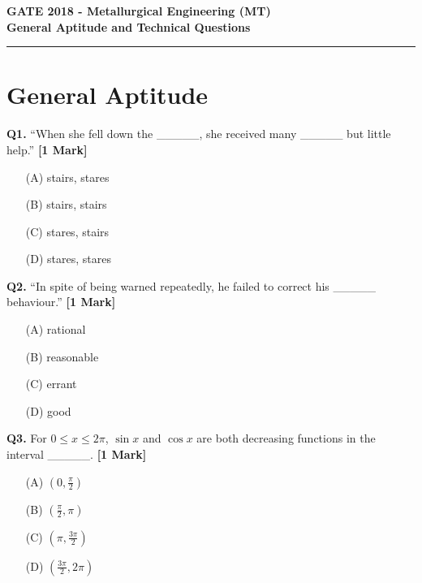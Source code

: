 \documentclass[11pt]{article}
\newcommand{\questiona}[2]{
    \noindent\textbf{Q#2.} #1 \hfill \textbf{[1 Mark]}
}
\begin{document}
\begin{center}
    \Large\textbf{GATE 2018 - Metallurgical Engineering (MT)} \\
    \large\textbf{General Aptitude and Technical Questions} \\
    \rule{\textwidth}{0.5pt} %
\end{center}

\vspace{0.5cm}


\section*{General Aptitude}

\questiona{“When she fell down the \_\_\_\_\_, she received many \_\_\_\_\_ but little help.”}{1}
\begin{enumerate}
    \item[(A)] stairs, stares  
    \item[(B)] stairs, stairs  
    \item[(C)] stares, stairs  
    \item[(D)] stares, stares  
\end{enumerate}
\vspace{0.5cm}

\questiona{“In spite of being warned repeatedly, he failed to correct his \_\_\_\_\_ behaviour.”}{2}
\begin{enumerate}
    \item[(A)] rational  
    \item[(B)] reasonable  
    \item[(C)] errant  
    \item[(D)] good  
\end{enumerate}
\vspace{0.5cm}

\questiona{For \(0 \leq x \leq 2\pi\), \(\sin x\) and \(\cos x\) are both decreasing functions in the interval \_\_\_\_\_.}{3}
\begin{enumerate}
    \item[(A)] \( (0, \frac{\pi}{2}) \)  
    \item[(B)] \( (\frac{\pi}{2}, \pi) \)  
    \item[(C)] \( (\pi, \frac{3\pi}{2}) \)  
    \item[(D)] \( (\frac{3\pi}{2}, 2\pi) \)  
\end{enumerate}
\vspace{0.5cm}
\end{document}
